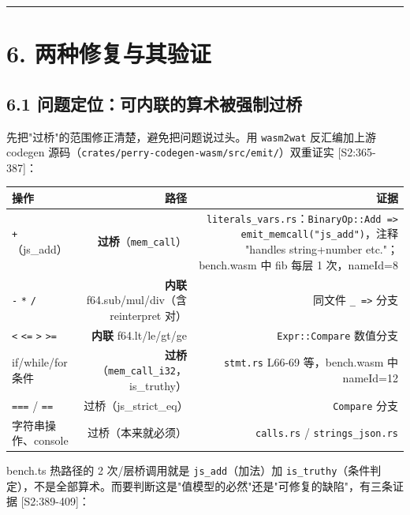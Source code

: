 \documentclass[11pt, a4paper]{article}
\begin{document}
\bigskip\hrule\bigskip

\section{6. 两种修复与其验证}

\subsection{6.1 问题定位：可内联的算术被强制过桥}

先把"过桥"的范围修正清楚，避免把问题说过头。用 \texttt{wasm2wat} 反汇编加上游 codegen 源码（\texttt{crates/perry-codegen-wasm/src/emit/}）双重证实 [S2:365-387]：


\begin{center}\small\begin{tabular}{lrr}
\toprule
操作 & 路径 & 证据 \\
\midrule
\texttt{+}（js\_add） & \textbf{过桥}（\texttt{mem\_call}） & \texttt{literals\_vars.rs}：\texttt{BinaryOp::Add => emit\_memcall("js\_add")}，注释 "handles string+number etc."；bench.wasm 中 fib 每层 1 次，nameId=8 \\
\texttt{-} \texttt{*} \texttt{/} & \textbf{内联} f64.sub/mul/div（含 reinterpret 对） & 同文件 \texttt{\_ =>} 分支 \\
\texttt{<} \texttt{<=} \texttt{>} \texttt{>=} & \textbf{内联} f64.lt/le/gt/ge & \texttt{Expr::Compare} 数值分支 \\
if/while/for 条件 & \textbf{过桥}（\texttt{mem\_call\_i32}，is\_truthy） & \texttt{stmt.rs} L66-69 等，bench.wasm 中 nameId=12 \\
\texttt{===} / \texttt{==} & 过桥（js\_strict\_eq） & \texttt{Compare} 分支 \\
字符串操作、console & 过桥（本来就必须） & \texttt{calls.rs} / \texttt{strings\_json.rs} \\
\bottomrule
\end{tabular}\end{center}


bench.ts 热路径的 2 次/层桥调用就是 \texttt{js\_add}（加法）加 \texttt{is\_truthy}（条件判定），不是全部算术。而要判断这是"值模型的必然"还是"可修复的缺陷"，有三条证据 [S2:389-409]：
\end{document}
